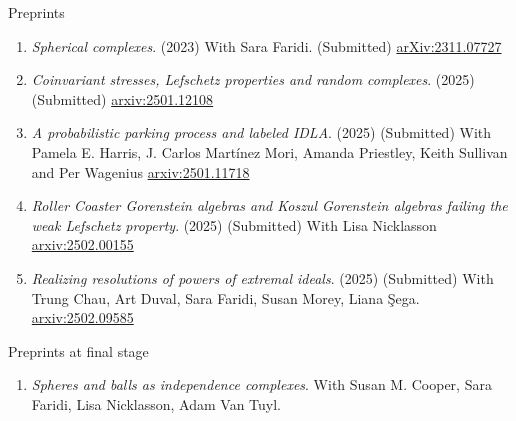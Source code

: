 \documentclass[12pt]{resume} %
\begin{document}
\begin{rSection}{Preprints}

\begin{enumerate}
    \item \textit{Spherical complexes}. (2023) With Sara Faridi. (Submitted) \href{https://arxiv.org/abs/2311.07727}{arXiv:2311.07727}
    \item \textit{Coinvariant stresses, Lefschetz properties and random complexes}. (2025) (Submitted) \href{https://arxiv.org/abs/2501.12108}{arxiv:2501.12108}
    \item \textit{A probabilistic parking process and labeled IDLA}. (2025) (Submitted) With Pamela E. Harris, J. Carlos Martínez Mori, Amanda Priestley, Keith Sullivan and Per Wagenius  \href{https://arxiv.org/abs/2501.11718}{arxiv:2501.11718}
    \item \textit{Roller Coaster Gorenstein algebras and Koszul Gorenstein algebras failing the weak Lefschetz property}. (2025) (Submitted) With Lisa Nicklasson  \href{https://arxiv.org/abs/2502.00155}{arxiv:2502.00155}
    \item \textit{Realizing resolutions of powers of extremal ideals}. (2025) (Submitted) With Trung Chau, Art Duval, Sara Faridi, Susan Morey, Liana \c{S}ega. \href{https://arxiv.org/pdf/2502.09585}{arxiv:2502.09585}
\end{enumerate}
\end{rSection}


\begin{rSection}{Preprints at final stage}

    \begin{enumerate}
        \item \textit{Spheres and balls as independence complexes}. With Susan M. Cooper, Sara Faridi, Lisa Nicklasson, Adam Van Tuyl. 
    \end{enumerate}
\end{rSection}

\end{document}

